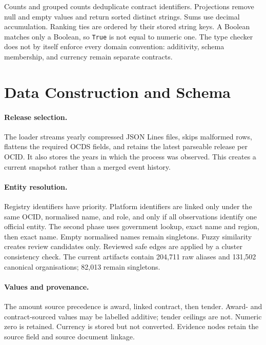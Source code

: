 Counts and grouped counts deduplicate contract identifiers.  Projections remove null and empty
values and return sorted distinct strings.  Sums use decimal accumulation.  Ranking ties are
ordered by their stored string keys.  A Boolean matches only a Boolean, so \texttt{True} is not
equal to numeric one.  The type checker does not by itself enforce every domain convention:
additivity, schema membership, and currency remain separate contracts.

\section{Data Construction and Schema}
\label{app:data}

\paragraph{Release selection.}
The loader streams yearly compressed JSON Lines files, skips malformed rows, flattens the required
OCDS fields, and retains the latest parseable release per OCID.  It also stores the years in which
the process was observed.  This creates a current snapshot rather than a merged event history.

\paragraph{Entity resolution.}
Registry identifiers have priority.  Platform identifiers are linked only under the same OCID,
normalised name, and role, and only if all observations identify one official entity.  The second
phase uses government lookup, exact name and region, then exact name.  Empty normalised names remain
singletons.  Fuzzy similarity creates review candidates only.  Reviewed safe edges are applied by
a cluster consistency check.  The current artifacts contain 204,711 raw aliases and 131,502
canonical organisations; 82,013 remain singletons.

\paragraph{Values and provenance.}
The amount source precedence is award, linked contract, then tender.  Award- and contract-sourced
values may be labelled additive; tender ceilings are not.  Numeric zero is retained.  Currency is
stored but not converted.  Evidence nodes retain the source field and source document linkage.

